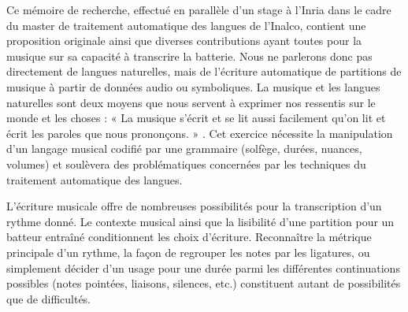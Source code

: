 Ce mémoire de recherche, effectué en parallèle d’un stage à l’Inria dans le
cadre du master de traitement automatique des langues de l’Inalco, contient
une proposition originale ainsi que diverses contributions ayant toutes pour
la musique sur sa capacité à transcrire la batterie. 
Nous ne parlerons donc pas
directement de langues naturelles, mais de l’écriture
automatique de partitions
de musique à partir de données audio ou symboliques. La musique et les langues
naturelles sont deux moyens que nous servent à exprimer nos ressentis sur le
monde et les choses : « La musique s’écrit et se lit aussi facilement qu’on lit
et écrit les paroles que nous prononçons. » \cite{danhauser}.
Cet exercice nécessite la manipulation d’un langage
musical codifié par une grammaire (solfège, durées, nuances, volumes) et
soulèvera des problématiques concernées par les techniques du traitement
automatique des langues.

L’écriture musicale offre de nombreuses possibilités pour la transcription d’un
rythme donné. Le contexte musical ainsi que la lisibilité d’une partition pour
un batteur entraîné conditionnent les choix d’écriture. Reconnaître la
métrique principale d’un rythme, la façon de regrouper les notes par les
ligatures, ou simplement décider d’un usage pour une durée parmi les
différentes continuations possibles (notes pointées, liaisons, silences, etc.)
constituent autant de possibilités que de difficultés.

